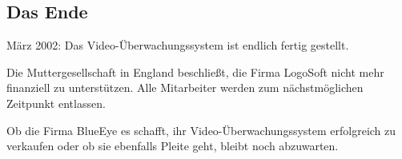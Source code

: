 \subsection{Das Ende}

März 2002: Das Video-Überwachungssystem ist endlich fertig gestellt.

Die Muttergesellschaft in England beschließt, die Firma LogoSoft nicht mehr
finanziell zu unterstützen. Alle Mitarbeiter werden zum nächstmöglichen
Zeitpunkt entlassen.

Ob die Firma BlueEye es schafft, ihr Video-Überwachungssystem erfolgreich zu
verkaufen oder ob sie ebenfalls Pleite geht, bleibt noch abzuwarten.
